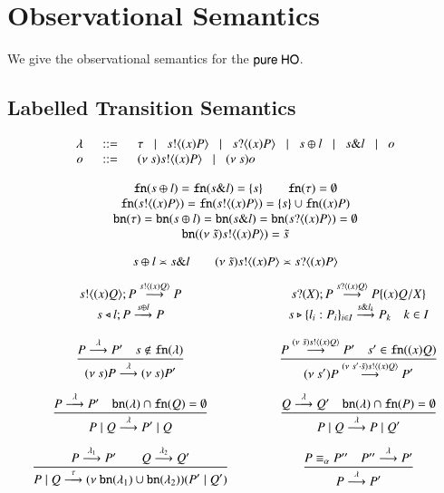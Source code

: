 \section{Observational Semantics}

We give the observational semantics for the $\mathsf{pure\ HO}$.

\subsection{Labelled Transition Semantics}

\[
	\begin{array}{rcl}
		\lambda &\;\;::=\;\;& \tau \;\;\;|\;\;\; s ! \langle (x)P \rangle \;\;\;|\;\;\; s ? \langle (x)P \rangle \;\;\;|\;\;\; s \oplus l \;\;\;|\;\;\; s \& l \;\;\;|\;\;\; o\\
		o &\;\;::=\;\;& (\nu\ s) s ! \langle (x)P \rangle \;\;\;|\;\;\; (\nu\ s) o
	\end{array}
\]

\[
	\begin{array}{c}
		\mathtt{fn}(s \oplus l) = \mathtt{fn}(s \& l) = \{s\} \qquad \mathtt{fn}(\tau) = \emptyset \\ 
		\mathtt{fn}(s ! \langle (x)P \rangle) = \mathtt{fn}(s ! \langle (x)P \rangle) = \{s\} \cup \mathtt{fn}((x)P)\\
		\mathtt{bn}(\tau) = \mathtt{bn}(s \oplus l) = \mathtt{bn}(s \& l) = \mathtt{bn}(s ? \langle (x)P \rangle) = \emptyset\\
		\mathtt{bn}((\nu\ \tilde{s}) s ! \langle (x)P \rangle) = \tilde{s}
	\end{array}
\]

\[
	s \oplus l \asymp s \& l \qquad (\nu\ \tilde{s}) s ! \langle (x)P \rangle \asymp s ? \langle (x)P \rangle
\]


\[
\begin{array}{ccc}
	\bout{s}{\abs{x}{Q}} P \by{\bactout{s}{\abs{x}{Q}}} P
	&\qquad&
	\binp{s}{X} P \by{\bactinp{s}{\abs{x}Q}} P\subst{\abs{x}Q}{X}
	\\

	\bsel{s}{l}{P} \by{\bactsel{s}{l}} P
	&&
	\bbra{s}{l_i:P_i}_{i \in I} \by{\bactbra{s}{l_k}} P_k \quad k \in I
	\\[4mm]

	\tree{
		P \by{\lambda} P' \quad s \notin \fn{\lambda}
	}{
		\news{s} P \by{\lambda} \news{s} P' 
	}
	&&
	\tree{
		P \by{\news{\tilde{s}} \bactout{s}{\abs{x} Q}} P' \quad s' \in \fn{\abs{x} Q}
	}{
		\news{s'} P \by{\news{s'\cat\tilde{s}} \bactout{s}{\abs{x} Q}} P'
	}
	\\[7mm]

	\tree{
		P \by{\lambda} P' \quad \bn{\lambda} \cap \fn{Q} = \es
	}{
		P \Par Q \by{\lambda} P' \Par Q
	}
	&&
	\tree{
		Q \by{\lambda} Q' \quad \bn{\lambda} \cap \fn{P} = \es
	}{
		P \Par Q \by{\lambda} P \Par Q'
	}
	\\[7mm]

	\tree{
		P \by{\lambda_1} P' \qquad Q \by{\lambda_2} Q'
	}{
		P \Par Q \by{\tau} \newsp{\bn{\lambda_1} \cup \bn{\lambda_2}}{P' \Par Q'}
	}
	&&
	\tree{
		P \scong_\alpha P'' \quad P'' \by{\lambda} P'
	}{
		P \by{\lambda} P'
	}
\end{array}
\]


